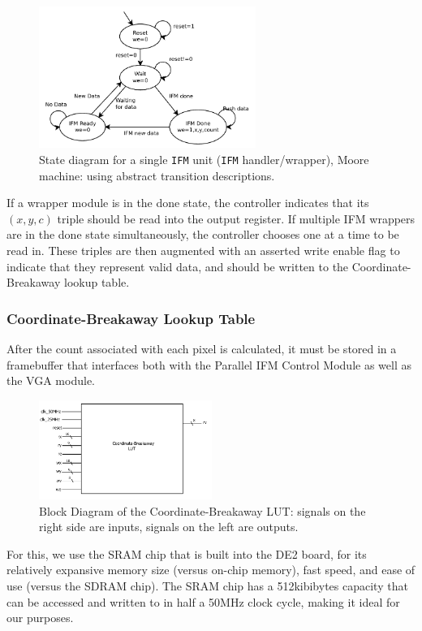 \documentclass{article}
\begin{document}
\begin{figure}[H]
  \centering
    \includegraphics[width=200pt]{state_diagrams/ifmunit.pdf}
  \caption{State diagram for a single \texttt{IFM} unit (\texttt{IFM} handler/wrapper),
    Moore machine: using abstract transition descriptions.}
\end{figure}

If a wrapper module is in the done state, the controller indicates that its $(x, y, c)$ triple should be read into
the output register. If multiple IFM wrappers are in the done state simultaneously, the controller chooses one at a
time to be read in. These triples are then augmented with an asserted write enable flag to indicate that they represent
valid data, and should be written to the Coordinate-Breakaway lookup table. 


\subsubsection{Coordinate-Breakaway Lookup Table}

After the count associated with each pixel is calculated, it must be
stored in a framebuffer that interfaces both with the Parallel IFM
Control Module as well as the VGA module.

\begin{figure}[H]
  \centering
    \includegraphics[width=160pt]{block_diagrams/clut.pdf}
  \caption{Block Diagram of the Coordinate-Breakaway LUT: signals on
    the right side are inputs, signals on the left are outputs.}
\end{figure}

For this, we use the SRAM chip that is built into the DE2 board, for
its relatively expansive memory size (versus on-chip memory), fast
speed, and ease of use (versus the SDRAM chip). The SRAM chip has a 
512kibibytes capacity that can be accessed and written to in half a 50MHz
clock cycle, making it ideal for our purposes.
\end{document}
